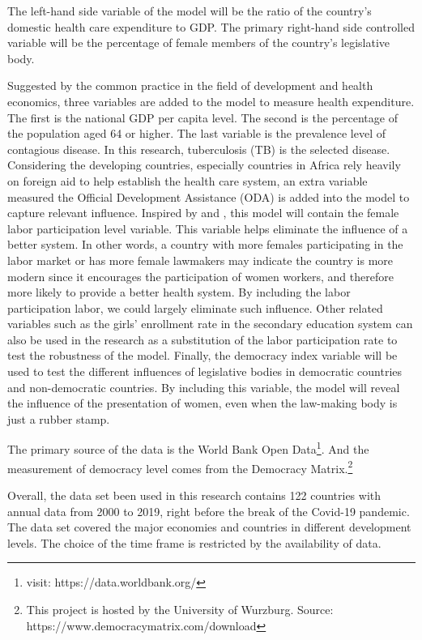 \documentclass[12pt]{article}
\begin{document}
The left-hand side variable of the model will be the ratio of the country's domestic health care expenditure to GDP.
The primary right-hand side controlled variable will be the percentage of female members of the country's legislative body.

Suggested by the common practice in the field of development and health economics, three variables are added to the model to measure health expenditure.
The first is the national GDP per capita level.
The second is the percentage of the population aged 64 or higher.
The last variable is the prevalence level of contagious disease.
In this research, tuberculosis (TB) is the selected disease.
Considering the developing countries, especially countries in Africa rely heavily on foreign aid to help establish the health care system, an extra variable measured the Official Development Assistance (ODA) is added into the model to capture relevant influence.
Inspired by  and , this model will contain the female labor participation level variable.
This variable helps eliminate the influence of a better system.
In other words, a country with more females participating in the labor market or has more female lawmakers may indicate the country is more modern since it encourages the participation of women workers, and therefore more likely to provide a better health system.
By including the labor participation labor, we could largely eliminate such influence.
Other related variables such as the girls' enrollment rate in the secondary education system can also be used in the research as a substitution of the labor participation rate to test the robustness of the model. 
Finally, the democracy index variable will be used to test the different influences of legislative bodies in democratic countries and non-democratic countries.
By including this variable, the model will reveal the influence of the presentation of women, even when the law-making body is just a rubber stamp.

The primary source of the data is the World Bank Open Data\footnote{visit: https://data.worldbank.org/}.
And the measurement of democracy level comes from the Democracy Matrix.\footnote{This project is hosted by the University of Wurzburg. Source: https://www.democracymatrix.com/download}

Overall, the data set been used in this research contains 122 countries with annual data from 2000 to 2019, right before the break of the Covid-19 pandemic.
The data set covered the major economies and countries in different development levels.
The choice of the time frame is restricted by the availability of data.
\end{document}
